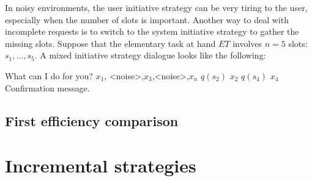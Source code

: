 		In noisy environments, the user initiative strategy can be very tiring to the user, especially when the number of slots is important. Another way to deal with incomplete requests is to switch to the system initiative strategy to gather the missing slots. Suppose that the elementary task at hand $ET$ involves $n=5$ slots: $s_1,...,s_5$. A mixed initiative strategy dialogue looks like the following:
		
		\begin{dialogue}
			 What can I do for you?
			 $x_1$, <noise>,$x_3$,<noise>,$x_n$
			 $q(s_2)$
			 $x_2$
			 $q(s_4)$
			 $x_4$
			 Confirmation message.
		\end{dialogue}
	
	\subsection{First efficiency comparison}
	
		

\section{Incremental strategies}
\label{sec:incrstrat}